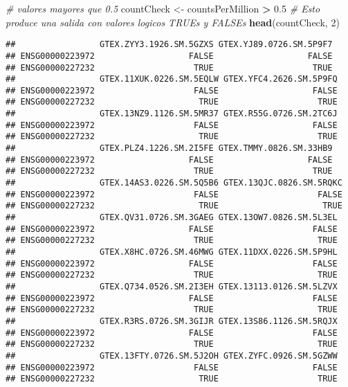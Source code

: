 \documentclass[
]{article}
\newenvironment{Shaded}{\begin{snugshade}}{\end{snugshade}}
\newcommand{\CommentTok}[1]{\textcolor[rgb]{0.56,0.35,0.01}{\textit{#1}}}
\newcommand{\DecValTok}[1]{\textcolor[rgb]{0.00,0.00,0.81}{#1}}
\newcommand{\FloatTok}[1]{\textcolor[rgb]{0.00,0.00,0.81}{#1}}
\newcommand{\KeywordTok}[1]{\textcolor[rgb]{0.13,0.29,0.53}{\textbf{#1}}}
\newcommand{\NormalTok}[1]{#1}
\newcommand{\OperatorTok}[1]{\textcolor[rgb]{0.81,0.36,0.00}{\textbf{#1}}}
\newcommand{\StringTok}[1]{\textcolor[rgb]{0.31,0.60,0.02}{#1}}
\begin{document}
\begin{Shaded}
\begin{Highlighting}[]
\CommentTok{# valores mayores que 0.5}
\NormalTok{countCheck <-}\StringTok{ }\NormalTok{countsPerMillion }\OperatorTok{>}\StringTok{ }\FloatTok{0.5}
\CommentTok{# Esto produce una salida con valores logicos TRUEs y FALSEs}
\KeywordTok{head}\NormalTok{(countCheck, }\DecValTok{2}\NormalTok{)}
\end{Highlighting}
\end{Shaded}

\begin{verbatim}
##                 GTEX.ZYY3.1926.SM.5GZXS GTEX.YJ89.0726.SM.5P9F7
## ENSG00000223972                   FALSE                   FALSE
## ENSG00000227232                    TRUE                    TRUE
##                 GTEX.11XUK.0226.SM.5EQLW GTEX.YFC4.2626.SM.5P9FQ
## ENSG00000223972                    FALSE                   FALSE
## ENSG00000227232                     TRUE                    TRUE
##                 GTEX.13NZ9.1126.SM.5MR37 GTEX.R55G.0726.SM.2TC6J
## ENSG00000223972                    FALSE                   FALSE
## ENSG00000227232                     TRUE                    TRUE
##                 GTEX.PLZ4.1226.SM.2I5FE GTEX.TMMY.0826.SM.33HB9
## ENSG00000223972                   FALSE                   FALSE
## ENSG00000227232                    TRUE                    TRUE
##                 GTEX.14AS3.0226.SM.5Q5B6 GTEX.13QJC.0826.SM.5RQKC
## ENSG00000223972                    FALSE                    FALSE
## ENSG00000227232                     TRUE                     TRUE
##                 GTEX.QV31.0726.SM.3GAEG GTEX.13OW7.0826.SM.5L3EL
## ENSG00000223972                   FALSE                    FALSE
## ENSG00000227232                    TRUE                     TRUE
##                 GTEX.X8HC.0726.SM.46MWG GTEX.11DXX.0226.SM.5P9HL
## ENSG00000223972                   FALSE                    FALSE
## ENSG00000227232                    TRUE                     TRUE
##                 GTEX.Q734.0526.SM.2I3EH GTEX.13113.0126.SM.5LZVX
## ENSG00000223972                   FALSE                    FALSE
## ENSG00000227232                    TRUE                     TRUE
##                 GTEX.R3RS.0726.SM.3GIJR GTEX.13S86.1126.SM.5RQJX
## ENSG00000223972                   FALSE                    FALSE
## ENSG00000227232                    TRUE                     TRUE
##                 GTEX.13FTY.0726.SM.5J2OH GTEX.ZYFC.0926.SM.5GZWW
## ENSG00000223972                    FALSE                   FALSE
## ENSG00000227232                     TRUE                    TRUE

\end{verbatim}
\end{document}
